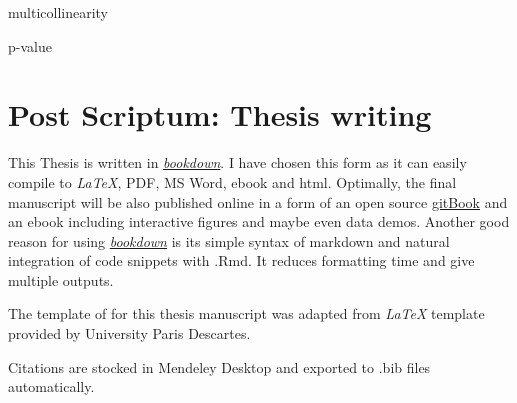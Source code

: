 \documentclass[12pt,]{book}
\theoremstyle{definition}
\theoremstyle{definition}
\theoremstyle{definition}
\theoremstyle{remark}
\begin{document}
multicollinearity

p-value

\hypertarget{post-scriptum-thesis-writing}{%
\chapter*{Post Scriptum: Thesis
writing}\label{post-scriptum-thesis-writing}}

This Thesis is written in
\href{https://github.com/rstudio/bookdown}{\emph{bookdown}}. I have
chosen this form as it can easily compile to \emph{LaTeX}, PDF, MS Word,
ebook and html. Optimally, the final manuscript will be also published
online in a form of an open source
\href{https://www.gitbook.com/about}{gitBook} and an ebook including
interactive figures and maybe even data demos. Another good reason for
using \href{https://github.com/rstudio/bookdown}{\emph{bookdown}} is its
simple syntax of markdown and natural integration of code snippets with
.Rmd. It reduces formatting time and give multiple outputs.

The template of for this thesis manuscript was adapted from \emph{LaTeX}
template provided by University Paris Descartes.

Citations are stocked in Mendeley Desktop and exported to .bib files
automatically.



\end{document}
